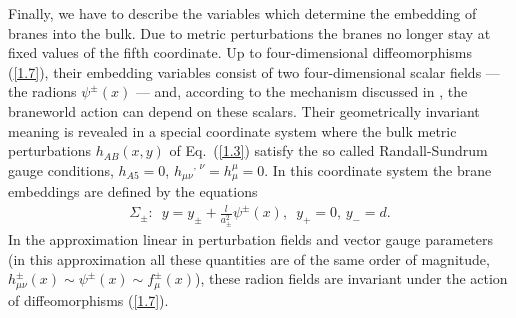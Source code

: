 \documentclass[a4paper,preprint,nofootinbib,
                 showpacs,preprintnumbers,amsmath,amssymb]{revtex4}
\begin{document}
Finally, we have to describe the variables which determine the 
embedding of branes into the bulk. Due to metric perturbations the 
branes no longer stay at fixed values of the fifth coordinate. Up 
to four-dimensional diffeomorphisms (\ref{1.7}), their embedding 
variables consist of two four-dimensional scalar fields --- the 
radions $\psi^\pm(x)$ --- and, according to the mechanism 
discussed in \cite{brane}, the braneworld action can depend on 
these scalars. Their geometrically invariant meaning is revealed 
in a special coordinate system where the bulk metric perturbations 
$h_{AB}(x,y)$ of Eq.~(\ref{1.3}) satisfy the so called 
Randall-Sundrum gauge conditions, $h_{A5}=0$, 
${h_{\mu\nu}}^{,\,\nu}=h_\mu^\mu=0$. In this coordinate system the 
brane embeddings are defined by the equations 
   \begin{eqnarray} 
   \Sigma_\pm:\,\,\, 
   y=y_\pm+\frac l{a^2_\pm}\psi^\pm(x),\,\,\, 
   y_+=0,\,y_-=d.                          \label{1.11} 
   \end{eqnarray} 
In the approximation linear in perturbation fields and vector 
gauge parameters (in this approximation all these quantities are 
of the same order of magnitude, 
$h^\pm_{\mu\nu}(x)\sim\psi^\pm(x)\sim f^\pm_\mu(x)$), these radion 
fields are invariant under the action of diffeomorphisms 
(\ref{1.7}). 
 
\end{document}
